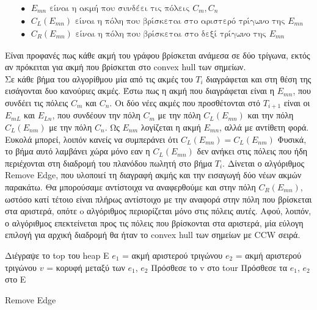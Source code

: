 \documentclass[oneside,12pt]{book}
\theoremstyle{definition}
\begin{document}
\begin{align*}
	& \bullet \text{ } E_{mn} \text{ είναι η ακμή που συνδέει τις πόλεις } C_m, C_n \\
	& \bullet \text{ } C_L(E_{mn}) \text{ είναι η πόλη που βρίσκεται στο αριστερό τρίγωνο της } E_{mn} \\
	& \bullet \text{ } C_R(E_{mn}) \text{ είναι η πόλη που βρίσκεται στο δεξί τρίγωνο της } E_{mn}
\end{align*}

Είναι προφανές πως κάθε ακμή του γράφου βρίσκεται ανάμεσα σε δύο τρίγωνα, εκτός αν πρόκειται για ακμή που βρίσκεται στο convex hull των σημείων. \\

Σε κάθε βήμα του αλγορίθμου μία από τις ακμές του \(T_i\) διαγράφεται και στη θέση της εισάγονται δυο κανούριες ακμές. Έστω πως η ακμή που διαγράφεται είναι η \(E_{mn}\), που συνδέει τις πόλεις \(C_m\) και \(C_n\). Οι δύο νέες ακμές που προσθέτονται στό \(Τ_{i+1}\) είναι οι \(E_{mL}\) και \(E_{Ln}\), που συνδέουν την πόλη \(C_m\) με την πόλη \(C_L(E_{mn})\) και την πόλη \(C_L(E_{nm})\) με την πόλη \(C_n\). Ως \(E_{nm}\) λογίζεται η ακμή \(E_{mn}\), αλλά με αντίθετη φορά. Ευκολά μπορεί, λοιπόν κανείς να συμπεράνει ότι \(C_L(E_{mn}) = C_L(E_{nm})\) Φυσικά, το βήμα αυτό λαμβάνει χώρα μόνο εαν η \(C_L(E_{mn})\) δεν ανήκει στις πόλεις που ήδη περιέχονται στη διαδρομή του πλανόδου πωλητή στο βήμα \(T_i\). Δίνεται ο αλγόριθμος Remove Edge, που υλοποιεί τη διαγραφή ακμής και την εισαγωγή δύο νέων ακμών παρακάτω. Θα μπορούσαμε αντίστοιχα να αναφερθούμε και στην πόλη \(C_R(E_{mn})\), ωστόσο κατί τέτοιο είναι πλήρως αντίστοιχο με την αναφορά στην πόλη που βρίσκεται στα αριστερά, οπότε o αλγόριθμος περιορίζεται μόνο στις πόλεις αυτές. Αφού, λοιπόν, ο αλγόριθμος επεκτείνεται προς τις πόλεις που βρίσκονται στα αριστερά, μία εύλογη επιλογή για αρχική διαδρομή θα ήταν το convex hull των σημείων με CCW σειρά. \\

\begin{algorithm}[H]
	\SetAlgoLined
	
	Διέγραψε το top του heap Ε \;
	\(e_1\) = ακμή αριστερού τριγώνου \;
	\(e_2\) = ακμή αριστερού τριγώνου \;	
	\(v\) = κορυφή μεταξύ των \(e_1\), \(e_2\) \;
	Πρόσθεσε το v στο tour \;
	Πρόσθεσε τα \(e_1\), \(e_2\) στο Ε \;
	
	\caption{Remove Edge}
\end{algorithm}
\end{document}
